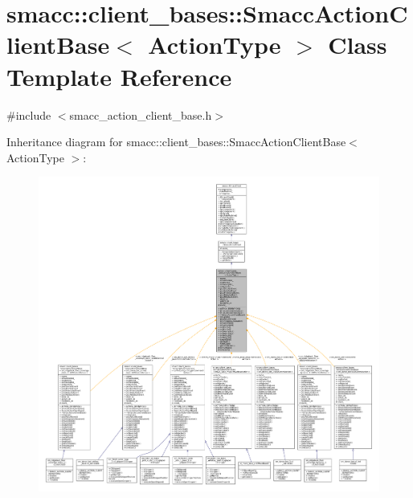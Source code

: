 \hypertarget{classsmacc_1_1client__bases_1_1SmaccActionClientBase}{}\section{smacc\+:\+:client\+\_\+bases\+:\+:Smacc\+Action\+Client\+Base$<$ Action\+Type $>$ Class Template Reference}
\label{classsmacc_1_1client__bases_1_1SmaccActionClientBase}


{\ttfamily \#include $<$smacc\+\_\+action\+\_\+client\+\_\+base.\+h$>$}



Inheritance diagram for smacc\+:\+:client\+\_\+bases\+:\+:Smacc\+Action\+Client\+Base$<$ Action\+Type $>$\+:
\nopagebreak
\begin{figure}[H]
\begin{center}
\leavevmode
\includegraphics[width=350pt]{classsmacc_1_1client__bases_1_1SmaccActionClientBase__inherit__graph}
\end{center}
\end{figure}


